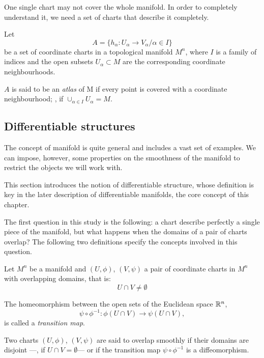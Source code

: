 One single chart may not cover the whole manifold. In order to completely understand it, we need a set of charts that describe it completely.

\begin{definition}
    Let
    \[
    A = \{h_\alpha \colon U_\alpha \to V_\alpha / \alpha \in I\}
    \]
    be a set of coordinate charts in a topological manifold $M^n$, where $I$ is a family of indices and the open subsets $U_\alpha \subset M$ are the corresponding coordinate neighbourhoods.

    $A$ is said to be an \emph{atlas} of M if every point is covered with a coordinate neighbourhood; \ie, if $\cup_{\alpha \in I} U_\alpha = M$.
\end{definition}


\subsection{Differentiable structures}

The concept of manifold is quite general and includes a vast set of examples. We can impose, however, some properties on the smoothness of the manifold to restrict the objects we will work with.

This section introduces the notion of differentiable structure, whose definition is key in the later description of differentiable manifolds, the core concept of this chapter.

The first question in this study is the following: a chart describe perfectly a single piece of the manifold, but what happens when the domains of a pair of charts overlap? The following two definitions specify the concepts involved in this question.


\begin{definition}
    Let $M^n$ be a manifold and $(U, \phi)$, $(V, \psi)$ a pair of coordinate charts in $M^n$ with overlapping domains, that is:
    \[
        U \cap V \neq \emptyset
    \]

    The homeomorphism between the open sets of the Euclidean space $\mathbb{R}^n$,
    \[
        \psi \circ \phi^{-1} \colon \phi(U \cap V) \to \psi(U \cap V),
    \]
    is called a \emph{transition map}.
\end{definition}

\begin{definition}
    Two charts $(U, \phi)$, $(V, \psi)$ are said to overlap smoothly if their domains are disjoint ---\ie, if $U \cap V  = \emptyset$--- or if the transition map $\psi \circ \phi^{-1}$ is a diffeomorphism.
\end{definition}

